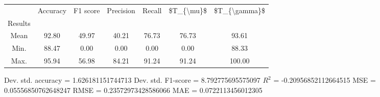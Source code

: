 \begin{tabular}{|c|c|c|c|c|c|c|}
\toprule
{} &  Accuracy &  F1 score &  Precision &  Recall &  \$T\_\{\textbackslash mu\}\$ &  \$T\_\{\textbackslash gamma\}\$ \\
Results &           &           &            &         &            &               \\
\hline
Mean    &     92.80 &     49.97 &      40.21 &   76.73 &      76.73 &         93.61 \\
Min.    &     88.47 &      0.00 &       0.00 &    0.00 &       0.00 &         88.33 \\
Max.    &     95.94 &     56.98 &      84.21 &   91.24 &      91.24 &        100.00 \\
\bottomrule
\end{tabular}

 Dev. std. accuracy = 1.626181151744713
 Dev. std. F1-score = 8.792775695575097
 $R^2$ = -0.20956852112664515
 MSE = 0.05556850762648247
 RMSE = 0.23572973428586066
 MAE = 0.0722113456012305